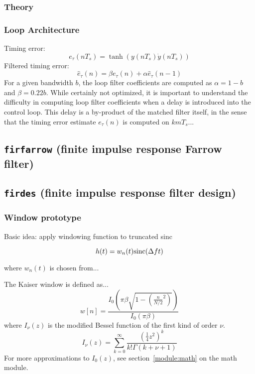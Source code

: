 \subsubsection{Theory}

\subsubsection{Loop Architecture}
Timing error:
\[
    e_\tau(nT_s) = \tanh\left( y(nT_s)\dot{y}(nT_s) \right)
\]
Filtered timing error:
\[
    \hat{e}_\tau(n) = \beta e_\tau(n) + \alpha \hat{e}_\tau(n-1)
\]
For a given bandwidth $b$, the loop filter coefficients are computed as
$\alpha = 1-b$ and $\beta = 0.22b$.
While certainly not optimized, it is important to understand the difficulty in
computing loop filter coefficients when a delay is introduced into the control
loop.
This delay is a by-product of the matched filter itself, in the sense that the
timing error estimate $e_\tau(n)$ is computed on $k m T_s$...

\subsection{{\tt firfarrow} (finite impulse response Farrow filter)}

\subsection{{\tt firdes} (finite impulse response filter design)}
\label{module:filter:firdes}

\subsubsection{Window prototype}
Basic idea: apply windowing function to truncated sinc

\begin{equation}
h(t) = w_n(t) \textup{sinc}(\Delta f t)
\end{equation}

where $w_n(t)$ is chosen from...

The Kaiser window is defined as...
\begin{equation}
\label{eqn:kaiser_window}
    w[n] = \frac{
        I_0\left(\pi\beta\sqrt{1-\left(\frac{n}{N/2}^2\right)}\right)
    }{
        I_0\left(\pi\beta\right)
    }
\end{equation}
where $I_\nu(z)$ is the modified Bessel function of the first kind of order
$\nu$.
\begin{equation}
\label{eqn:besseli_infinite_sum}
    I_\nu(z) = \sum_{k=0}^{\infty}{
        \frac{
            \left(\frac{1}{4}z^2\right)^k
        }{
            k!\Gamma(k+\nu+1)
        }
    }
\end{equation}
For more approximations to $I_0(z)$, see section~\ref{module:math} on the math
module.


